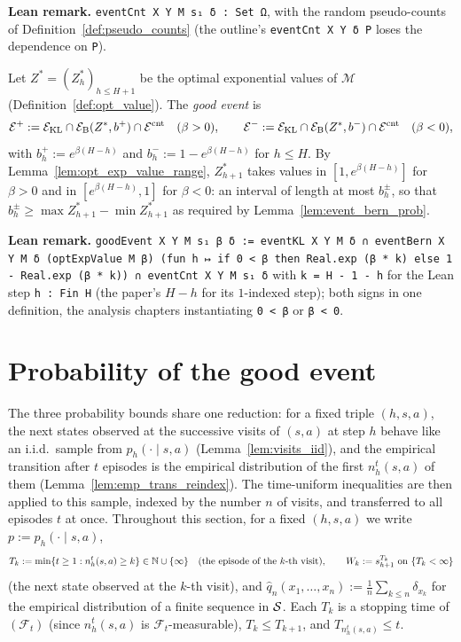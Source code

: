 \textbf{Lean remark.} \texttt{eventCnt X Y M s₁ δ : Set Ω}, with the random pseudo-counts of
Definition~\ref{def:pseudo_counts} (the outline's \texttt{eventCnt X Y δ P} loses the
dependence on \texttt{P}).

\begin{definition}\label{def:good_event}
\leanok
{}
Let $Z^* = (Z^*_h)_{h \le H + 1}$ be the optimal exponential values of $\mathcal M$
(Definition~\ref{def:opt_value}). The \emph{good event} is
\[
  \mathcal{E}^+ := \mathcal{E}_{\mathrm{KL}} \cap \mathcal{E}_{\mathrm{B}}(Z^*, b^+) \cap \mathcal{E}^{\mathrm{cnt}} \quad (\beta > 0),
  \qquad
  \mathcal{E}^- := \mathcal{E}_{\mathrm{KL}} \cap \mathcal{E}_{\mathrm{B}}(Z^*, b^-) \cap \mathcal{E}^{\mathrm{cnt}} \quad (\beta < 0),
\]
with $b^+_h := e^{\beta(H - h)}$ and $b^-_h := 1 - e^{\beta(H - h)}$ for $h \le H$. By
Lemma~\ref{lem:opt_exp_value_range}, $Z^*_{h+1}$ takes values in $[1, e^{\beta(H - h)}]$ for
$\beta > 0$ and in $[e^{\beta(H - h)}, 1]$ for $\beta < 0$: an interval of length at most $b^\pm_h$,
so that $b^\pm_h \ge \max Z^*_{h+1} - \min Z^*_{h+1}$ as required by Lemma~\ref{lem:event_bern_prob}.
\end{definition}

\textbf{Lean remark.} \texttt{goodEvent X Y M s₁ β δ := eventKL X Y M δ ∩ eventBern X Y M δ (optExpValue M β) (fun h ↦ if 0 < β then Real.exp (β * k) else 1 - Real.exp (β * k)) ∩ eventCnt X Y M s₁ δ}
with \texttt{k = H - 1 - h} for the Lean step \texttt{h : Fin H} (the paper's $H - h$ for its
$1$-indexed step); both signs in one definition, the analysis chapters instantiating
\texttt{0 < β} or \texttt{β < 0}.

\section{Probability of the good event}
\label{sec:empirical_good_event}

The three probability bounds share one reduction: for a fixed triple $(h, s, a)$, the next
states observed at the successive visits of $(s, a)$ at step $h$ behave like an i.i.d.\
sample from $p_h(\cdot \mid s, a)$ (Lemma~\ref{lem:visits_iid}), and the empirical transition
after $t$ episodes is the empirical distribution of the first $n_h^t(s, a)$ of them
(Lemma~\ref{lem:emp_trans_reindex}). The time-uniform inequalities are then applied to this
sample, indexed by the number $n$ of visits, and transferred to all episodes $t$ at once.
Throughout this section, for a fixed $(h, s, a)$ we write $p := p_h(\cdot \mid s, a)$,
\[
  T_k := \min\{t \ge 1 : n_h^t(s, a) \ge k\} \in \mathbb{N} \cup \{\infty\}
  \quad\text{(the episode of the $k$-th visit)},
  \qquad
  W_k := s^{T_k}_{h+1} \text{ on } \{T_k < \infty\}
\]
(the next state observed at the $k$-th visit), and $\hat q_n(x_1, \dots, x_n) := \frac1n \sum_{k \le n} \delta_{x_k}$
for the empirical distribution of a finite sequence in $\mathcal{S}$. Each $T_k$ is a stopping time of
$(\mathcal F_t)$ (since $n_h^t(s, a)$ is $\mathcal F_t$-measurable), $T_k \le T_{k+1}$, and
$T_{n_h^t(s, a)} \le t$.

